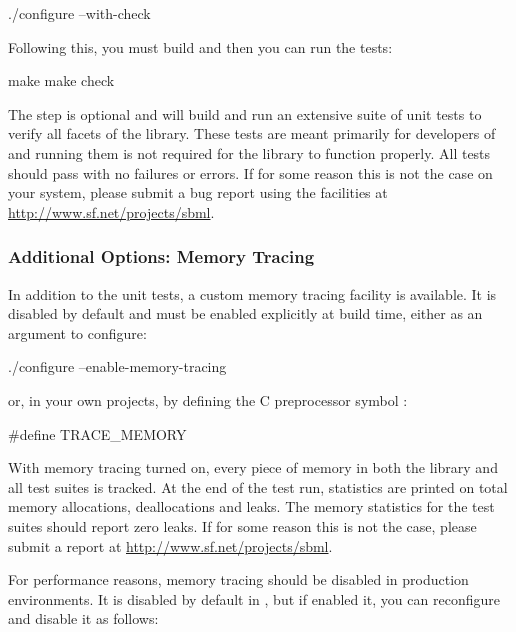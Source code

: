 \documentclass{sbmlmanual}
\begin{document}
\begin{example}[csh]
  ./configure --with-check
\end{example}

Following this, you must build \libsbml{} and then you can run the tests:

\begin{example}[csh]
  make
  make check
\end{example}

The  step is optional and will build and run an extensive
suite of unit tests to verify all facets of the library.  These tests are
meant primarily for developers of \libsbml{} and running them is not
required for the library to function properly.  All tests should pass with
no failures or errors.  If for some reason this is not the case on your
system, please submit a bug report using the facilities at
\url{http://www.sf.net/projects/sbml}.


\subsubsection{Additional Options: Memory Tracing}

In addition to the unit tests, a custom memory tracing facility is
available.  It is disabled by default and must be enabled explicitly
at build time, either as an argument to configure:

\begin{example}[csh]
  ./configure --enable-memory-tracing
\end{example}

or, in your own projects, by defining the C preprocessor symbol
:

\begin{example}[c]
  #define TRACE_MEMORY
\end{example}

With memory tracing turned on, every piece of memory in both the library
and all test suites is tracked.  At the end of the test run, statistics are
printed on total memory allocations, deallocations and leaks.  The memory
statistics for the test suites should report zero leaks.  If for some
reason this is not the case, please submit a report at
\url{http://www.sf.net/projects/sbml}.

For performance reasons, memory tracing should be disabled in production
environments.  It is disabled by default in \libsbml{}, but if enabled it,
you can reconfigure and disable it as follows:
\end{document}
